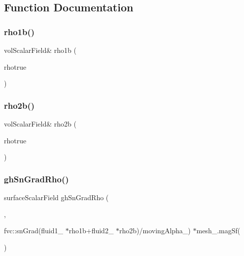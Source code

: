 \subsection{Function Documentation}
\mbox{\label{calcPhiS__2p_8H_a91d1f9ec51e6b9a48a4e138602396604}} 
\subsubsection{\texorpdfstring{rho1b()}{rho1b()}}
{\footnotesize\ttfamily vol\+Scalar\+Field\& rho1b (\begin{DoxyParamCaption}\item[{fluid1\+\_\+.}]{rhotrue }\end{DoxyParamCaption})}

\mbox{\label{calcPhiS__2p_8H_a05007b79f2d136ddfa62517a751f3d7a}} 
\subsubsection{\texorpdfstring{rho2b()}{rho2b()}}
{\footnotesize\ttfamily vol\+Scalar\+Field\& rho2b (\begin{DoxyParamCaption}\item[{fluid2\+\_\+.}]{rhotrue }\end{DoxyParamCaption})}

\mbox{\label{calcPhiS__2p_8H_a927b6934c2b9e9cfe771d567c3e748c3}} 
\subsubsection{\texorpdfstring{gh\+Sn\+Grad\+Rho()}{ghSnGradRho()}}
{\footnotesize\ttfamily surface\+Scalar\+Field gh\+Sn\+Grad\+Rho (\begin{DoxyParamCaption}\item[{\char`\"{}gh\+Sn\+Grad\+Rho\char`\"{}}]{,  }\item[{ghf\+\_\+ $\ast$}]{fvc\+::sn\+Grad(fluid1\+\_\+ $\ast$rho1b+fluid2\+\_\+ $\ast$rho2b)/moving\+Alpha\+\_\+) $\ast$mesh\+\_\+.\+mag\+Sf( }\end{DoxyParamCaption})}

